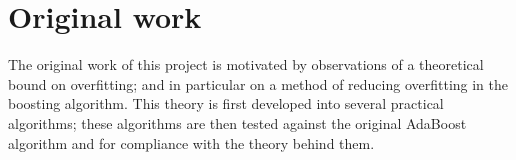 \section{Original work}

The original work of this project is motivated by observations of a
theoretical bound on overfitting; and in particular on a method of
reducing overfitting in the boosting algorithm.  This theory is first
developed into several practical algorithms; these algorithms are then
tested against the original AdaBoost algorithm and for compliance with
the theory behind them.





